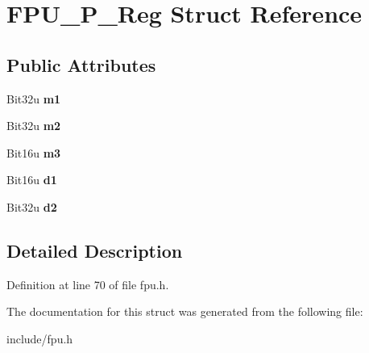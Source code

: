 \hypertarget{structFPU__P__Reg}{\section{F\-P\-U\-\_\-\-P\-\_\-\-Reg Struct Reference}
\label{structFPU__P__Reg}
}
\subsection*{Public Attributes}
\begin{DoxyCompactItemize}
\item 
\hypertarget{structFPU__P__Reg_a6891fdbb0f3fd7a10055ecfc0404014f}{Bit32u {\bfseries m1}}\label{structFPU__P__Reg_a6891fdbb0f3fd7a10055ecfc0404014f}

\item 
\hypertarget{structFPU__P__Reg_a279a18d4e87be85c345144eb59d972d6}{Bit32u {\bfseries m2}}\label{structFPU__P__Reg_a279a18d4e87be85c345144eb59d972d6}

\item 
\hypertarget{structFPU__P__Reg_a388e65500cd3d7e74fe1a2ce5b16c406}{Bit16u {\bfseries m3}}\label{structFPU__P__Reg_a388e65500cd3d7e74fe1a2ce5b16c406}

\item 
\hypertarget{structFPU__P__Reg_abce65930a4465a5a3e3429e0e66b80e7}{Bit16u {\bfseries d1}}\label{structFPU__P__Reg_abce65930a4465a5a3e3429e0e66b80e7}

\item 
\hypertarget{structFPU__P__Reg_a956b25eccf4a855e1fc9b80f06872775}{Bit32u {\bfseries d2}}\label{structFPU__P__Reg_a956b25eccf4a855e1fc9b80f06872775}

\end{DoxyCompactItemize}


\subsection{Detailed Description}


Definition at line 70 of file fpu.\-h.



The documentation for this struct was generated from the following file\-:\begin{DoxyCompactItemize}
\item 
include/fpu.\-h\end{DoxyCompactItemize}
